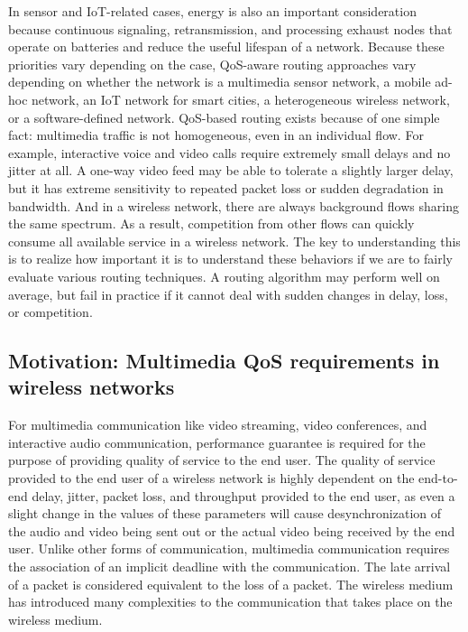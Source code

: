 \documentclass[12pt]{article}
\begin{document}
    
    In sensor and IoT-related cases, energy is also an important consideration because continuous signaling, retransmission, and processing exhaust nodes that operate on batteries and reduce the useful lifespan of a network. Because these priorities vary depending on the case, QoS-aware routing approaches vary depending on whether the network is a multimedia sensor network, a mobile ad-hoc network, an IoT network for smart cities, a heterogeneous wireless network, or a software-defined network.
    QoS-based routing exists because of one simple fact: multimedia traffic is not homogeneous, even in an individual flow. For example, interactive voice and video calls require extremely small delays and no jitter at all. A one-way video feed may be able to tolerate a slightly larger delay, but it has extreme sensitivity to repeated packet loss or sudden degradation in bandwidth. And in a wireless network, there are always background flows sharing the same spectrum. As a result, competition from other flows can quickly consume all available service in a wireless network. The key to understanding this is to realize how important it is to understand these behaviors if we are to fairly evaluate various routing techniques. A routing algorithm may perform well on average, but fail in practice if it cannot deal with sudden changes in delay, loss, or competition.
    \subsection{Motivation: Multimedia QoS requirements in wireless networks}
    For multimedia communication like video streaming, video conferences, and interactive audio communication, performance guarantee is required for the purpose of providing quality of service to the end user. The quality of service provided to the end user of a wireless network is highly dependent on the end-to-end delay, jitter, packet loss, and throughput provided to the end user, as even a slight change in the values of these parameters will cause desynchronization of the audio and video being sent out or the actual video being received by the end user. Unlike other forms of communication, multimedia communication requires the association of an implicit deadline with the communication. The late arrival of a packet is considered equivalent to the loss of a packet. The wireless medium has introduced many complexities to the communication that takes place on the wireless medium.
\end{document}
